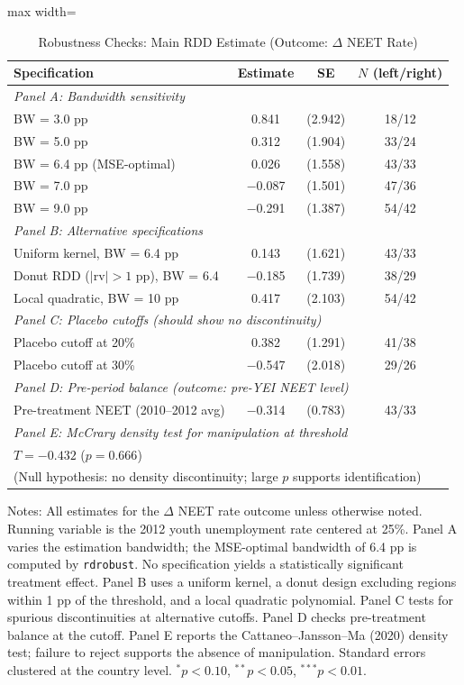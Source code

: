 \begin{table}[h!]
\centering
\caption{Robustness Checks: Main RDD Estimate (Outcome: $\Delta$ NEET Rate)}
\label{tab:robustness}
\begin{adjustbox}{max width=\textwidth}
\begin{tabular}{lccc}
\toprule
Specification & Estimate & SE & $N$ (left/right) \\
\midrule
\multicolumn{4}{l}{\textit{Panel A: Bandwidth sensitivity}} \\
BW = 3.0 pp & 0.841 & (2.942) & 18/12 \\
BW = 5.0 pp & 0.312 & (1.904) & 33/24 \\
BW = 6.4 pp (MSE-optimal) & 0.026 & (1.558) & 43/33 \\
BW = 7.0 pp & $-$0.087 & (1.501) & 47/36 \\
BW = 9.0 pp & $-$0.291 & (1.387) & 54/42 \\
\midrule
\multicolumn{4}{l}{\textit{Panel B: Alternative specifications}} \\
Uniform kernel, BW = 6.4 pp & 0.143 & (1.621) & 43/33 \\
Donut RDD ($|$rv$| > 1$ pp), BW = 6.4 & $-$0.185 & (1.739) & 38/29 \\
Local quadratic, BW = 10 pp & 0.417 & (2.103) & 54/42 \\
\midrule
\multicolumn{4}{l}{\textit{Panel C: Placebo cutoffs (should show no discontinuity)}} \\
Placebo cutoff at 20\% & 0.382 & (1.291) & 41/38 \\
Placebo cutoff at 30\% & $-$0.547 & (2.018) & 29/26 \\
\midrule
\multicolumn{4}{l}{\textit{Panel D: Pre-period balance (outcome: pre-YEI NEET level)}} \\
Pre-treatment NEET (2010--2012 avg) & $-$0.314 & (0.783) & 43/33 \\
\midrule
\multicolumn{4}{l}{\textit{Panel E: McCrary density test for manipulation at threshold}} \\
\multicolumn{4}{l}{\quad $T = -0.432$ ($p = 0.666$)} \\
\multicolumn{4}{l}{\quad (Null hypothesis: no density discontinuity; large $p$ supports identification)} \\
\bottomrule
\end{tabular}
\end{adjustbox}

\raggedright\footnotesize
Notes: All estimates for the $\Delta$ NEET rate outcome unless otherwise noted. Running variable is the 2012 youth unemployment rate centered at 25\%. Panel A varies the estimation bandwidth; the MSE-optimal bandwidth of 6.4 pp is computed by \texttt{rdrobust}. No specification yields a statistically significant treatment effect. Panel B uses a uniform kernel, a donut design excluding regions within 1 pp of the threshold, and a local quadratic polynomial. Panel C tests for spurious discontinuities at alternative cutoffs. Panel D checks pre-treatment balance at the cutoff. Panel E reports the Cattaneo--Jansson--Ma (2020) density test; failure to reject supports the absence of manipulation. Standard errors clustered at the country level. $^{*}p<0.10$, $^{**}p<0.05$, $^{***}p<0.01$.
\end{table}
